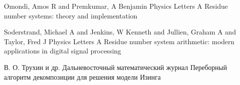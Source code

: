 \documentclass[10pt]{article}
\begin{document}
\begin{thebibliography}{20}
\by Omondi, Amos R and Premkumar, A Benjamin
\jour Physics Letters A
\paper Residue number systems: theory and implementation


\by Soderstrand, Michael A and Jenkins, W Kenneth and Jullien, Graham A and Taylor, Fred J
\jour Physics Letters A
\paper Residue number system arithmetic: modern applications in digital signal processing

\by В. О. Трухин и др.
\jour Дальневосточный математический журнал
\paper Переборный алгоритм декомпозиции для решения модели Изинга


\end{thebibliography}

\EndArticle
\end{document}
